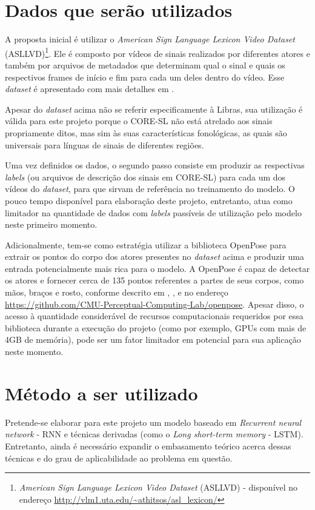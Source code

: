\section{Dados que serão utilizados}
\label{sec:dados-utilizados}
A proposta inicial é utilizar o \textit{American Sign Language Lexicon Video Dataset} (ASLLVD)\footnote{\textit{American Sign Language Lexicon Video Dataset} (ASLLVD) - disponível no endereço \url{http://vlm1.uta.edu/~athitsos/asl_lexicon/}}. Ele é composto por vídeos de sinais realizados por diferentes atores e também por arquivos de metadados que determinam qual o sinal e quais os respectivos frames de início e fim para cada um deles dentro do vídeo. Esse \textit{dataset} é apresentado com mais detalhes em \cite{athitsos-asldataset-2008}.

Apesar do \textit{dataset} acima não se referir especificamente à Libras, sua utilização é válida para este projeto porque o CORE-SL não está atrelado aos sinais propriamente ditos, mas sim às suas características fonológicas, as quais são universais para línguas de sinais de diferentes regiões. 

Uma vez definidos os dados, o segundo passo consiste em produzir as respectivas \textit{labels} (ou arquivos de descrição dos sinais em CORE-SL) para cada um dos vídeos do \textit{dataset}, para que sirvam de referência no treinamento do modelo. O pouco tempo disponível para elaboração deste projeto, entretanto, atua como limitador na quantidade de dados com \textit{labels} passíveis de utilização pelo modelo neste primeiro momento. 

Adicionalmente, tem-se como estratégia utilizar a biblioteca OpenPose para extrair os pontos do corpo dos atores presentes no \textit{dataset} acima e produzir uma entrada potencialmente mais rica para o modelo. A OpenPose é capaz de detectar os atores e fornecer cerca de 135 pontos referentes a partes de seus corpos, como mãos, braços e rosto, conforme descrito em \textcite{cao-realtime-2017}, \textcite{simon-hand-2017}, \textcite{wei-cpm-2016} e no endereço \url{https://github.com/CMU-Perceptual-Computing-Lab/openpose}. Apesar disso, o acesso à quantidade considerável de recursos computacionais requeridos por essa biblioteca durante a execução do projeto (como por exemplo, GPUs com mais de 4GB de memória), pode ser um fator limitador em potencial para sua aplicação neste momento.

\section{Método a ser utilizado}
Pretende-se elaborar para este projeto um modelo baseado em \textit{Recurrent neural network} - RNN e técnicas derivadas (como o \textit{Long short-term memory} - LSTM). Entretanto, ainda é necessário expandir o embasamento teórico acerca dessas técnicas e do grau de aplicabilidade ao problema em questão. 

